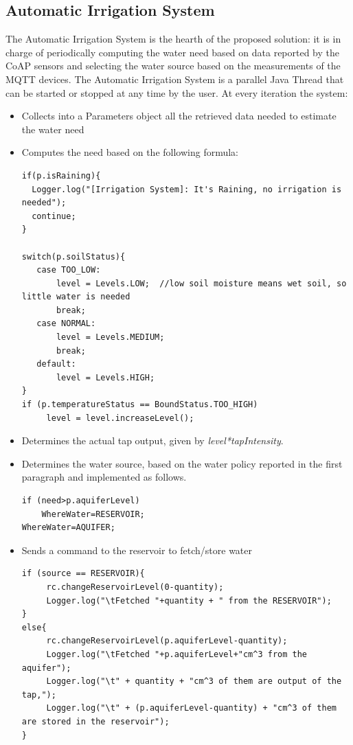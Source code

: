 \subsection{Automatic Irrigation System}
The Automatic Irrigation System is the hearth of the proposed solution: it is in charge of periodically computing the water need based on data reported by the CoAP sensors and selecting the water source based on the measurements of the MQTT devices. The Automatic Irrigation System is a parallel Java Thread that can be started or stopped at any time by the user. At every iteration the system:
\begin{itemize}
	\item Collects into a Parameters object all the retrieved data needed to estimate the water need
	\item Computes the need based on the following formula: 

\begin{lstlisting}
if(p.isRaining){
  Logger.log("[Irrigation System]: It's Raining, no irrigation is needed");
  continue;
}

switch(p.soilStatus){
   case TOO_LOW:
       level = Levels.LOW;  //low soil moisture means wet soil, so little water is needed
       break;
   case NORMAL:
       level = Levels.MEDIUM;
       break;
   default:
       level = Levels.HIGH;
}
if (p.temperatureStatus == BoundStatus.TOO_HIGH)
     level = level.increaseLevel();

\end{lstlisting}


	\item Determines the actual tap output, given by \textit{level*tapIntensity}.
	\item Determines the water source, based on the water policy reported in the first paragraph and implemented as follows.

\begin{lstlisting}
if (need>p.aquiferLevel)
    WhereWater=RESERVOIR;
WhereWater=AQUIFER;
\end{lstlisting}	
	
	\item Sends a command to the reservoir to fetch/store water
\begin{lstlisting}
if (source == RESERVOIR){
     rc.changeReservoirLevel(0-quantity);
     Logger.log("\tFetched "+quantity + " from the RESERVOIR");
}
else{
     rc.changeReservoirLevel(p.aquiferLevel-quantity);
     Logger.log("\tFetched "+p.aquiferLevel+"cm^3 from the aquifer");
     Logger.log("\t" + quantity + "cm^3 of them are output of the tap,");
     Logger.log("\t" + (p.aquiferLevel-quantity) + "cm^3 of them are stored in the reservoir");
}
\end{lstlisting}
\end{itemize}

